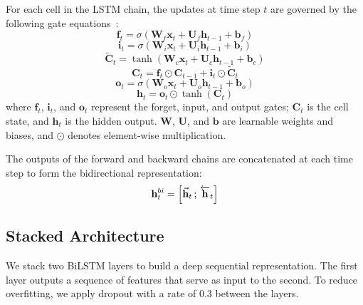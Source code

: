For each cell in the LSTM chain, the updates at time step $t$ are governed by the following gate equations~\cite{hochreiter1997long}:
\begin{equation}
    \mathbf{f}_t = \sigma\left( \mathbf{W}_f \mathbf{x}_t + \mathbf{U}_f \mathbf{h}_{t-1} + \mathbf{b}_f \right)
\end{equation}
\begin{equation}
    \mathbf{i}_t = \sigma\left( \mathbf{W}_i \mathbf{x}_t + \mathbf{U}_i \mathbf{h}_{t-1} + \mathbf{b}_i \right)
\end{equation}
\begin{equation}
    \tilde{\mathbf{C}}_t = \tanh\left( \mathbf{W}_c \mathbf{x}_t + \mathbf{U}_c \mathbf{h}_{t-1} + \mathbf{b}_c \right)
\end{equation}
\begin{equation}
    \mathbf{C}_t = \mathbf{f}_t \odot \mathbf{C}_{t-1} + \mathbf{i}_t \odot \tilde{\mathbf{C}}_t
\end{equation}
\begin{equation}
    \mathbf{o}_t = \sigma\left( \mathbf{W}_o \mathbf{x}_t + \mathbf{U}_o \mathbf{h}_{t-1} + \mathbf{b}_o \right)
\end{equation}
\begin{equation}
    \mathbf{h}_t = \mathbf{o}_t \odot \tanh(\mathbf{C}_t)
\end{equation}
where $\mathbf{f}_t$, $\mathbf{i}_t$, and $\mathbf{o}_t$ represent the forget, input, and output gates; $\mathbf{C}_t$ is the cell state, and $\mathbf{h}_t$ is the hidden output. $\mathbf{W}$, $\mathbf{U}$, and $\mathbf{b}$ are learnable weights and biases, and $\odot$ denotes element-wise multiplication.

The outputs of the forward and backward chains are concatenated at each time step to form the bidirectional representation:
\begin{equation}
    \mathbf{h}_t^{bi} = \left[ \vec{\mathbf{h}}_t \,;\, \protect\overleftarrow{\mathbf{h}}_t \right]
\end{equation}

\subsection{Stacked Architecture}
We stack two BiLSTM layers to build a deep sequential representation. The first layer outputs a sequence of features that serve as input to the second. To reduce overfitting, we apply dropout with a rate of 0.3 between the layers.


